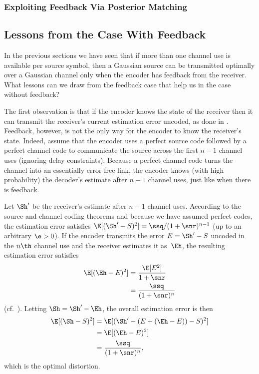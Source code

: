 \subsubsection{Exploiting Feedback Via Posterior Matching}


\subsection{Lessons from the Case With Feedback}

In the previous sections we have seen that if more than one channel use is
available per source symbol, then a Gaussian source can be transmitted optimally
over a Gaussian channel only when the encoder has feedback from the receiver.
What lessons can we draw from the feedback case that help us in the case without
feedback?

The first observation is that if the encoder knows the state of the receiver
then it can transmit the receiver's current estimation error uncoded, as done in
. Feedback, however, is not the only way for the encoder to know
the receiver's state. Indeed, assume that the encoder uses a perfect source code
followed by a perfect channel code to communicate the source across the first
$n-1$ channel uses (ignoring delay constraints). Because a perfect channel code
turns the channel into an essentially error-free link, the encoder knows (with
high probability) the decoder's estimate after $n-1$ channel uses, just like
when there is feedback.

Let $\Sh'$ be the receiver's estimate after $n-1$ channel uses. According to the
source and channel coding theorems and because we have assumed perfect codes,
the estimation error satisfies $\E[(\Sh' - S)^2] = \ssq / (1 + \snr)^{n-1}$ (up
to an arbitrary $\e > 0$). If the encoder transmits the error $E = \Sh' - S$
uncoded in the $n\th$ channel use and the receiver estimates it as~$\Eh$, the
resulting estimation error satisfies
\begin{align*}
  \E[(\Eh - E)^2] &= \frac{\E[E^2]}{ 1 + \snr } \\
  &= \frac{\ssq}{(1 + \snr)^n}
\end{align*}
(cf.~).
Letting $\Sh = \Sh' - \Eh$, the overall estimation error is then 
\begin{align*}
  \E[(\Sh - S)^2] &= \E[(\Sh' - (E + (\Eh - E)) - S)^2] \\
  &= \E[(\Eh - E)^2] \\
  &= \frac{\ssq}{(1 + \snr)^n},
\end{align*}
which is the optimal distortion. 

